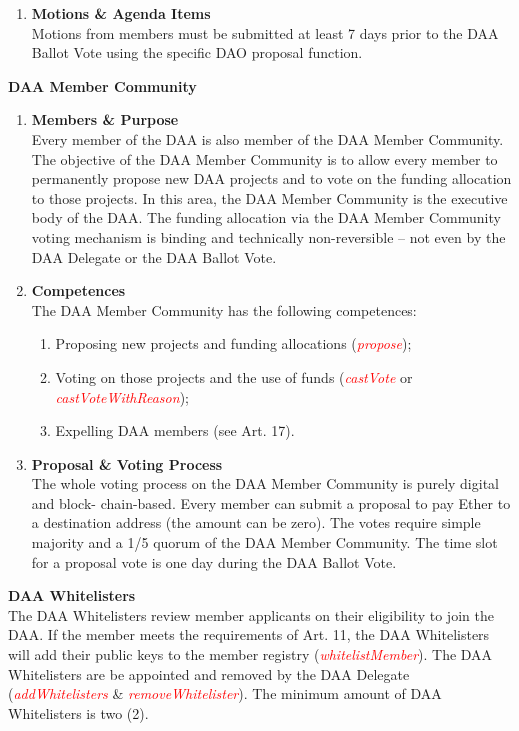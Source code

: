 \begin{enumerate}[label=\textbf{\arabic*.}]
    \item \textbf{Motions \& Agenda Items} \\
    Motions from members must be submitted at least 7 days prior to the DAA Ballot Vote using the specific DAO proposal function.
\end{enumerate}


\item \textbf{DAA Member Community} \\
\begin{enumerate}[label=\textbf{\arabic*.}]
    \item \textbf{Members \& Purpose} \\
    Every member of the DAA is also member of the DAA Member Community.
    The objective of the DAA Member Community is to allow every member to permanently propose new DAA projects and to vote on the funding allocation to those projects. %
    In this area, the DAA Member Community is the executive body of the DAA.
    The funding allocation via the DAA Member Community voting mechanism is binding and technically non-reversible – not even by the DAA Delegate or the DAA Ballot Vote.

    \item \textbf{Competences} \\
    The DAA Member Community has the following competences:
    \begin{enumerate}
        [label=(\alph*)]
        \item Proposing new projects and funding allocations (\textcolor{red}{\emph{propose}});
        \item Voting on those projects and the use of funds (\textcolor{red}{\emph{castVote}} or \textcolor{red}{\emph{castVoteWithReason}});
        \item Expelling DAA members (see Art. 17).
    \end{enumerate}

    \item \textbf{Proposal \& Voting Process} \\
    The whole voting process on the DAA Member Community is purely digital and block- chain-based.
    Every member can submit a proposal to pay Ether to a destination address (the amount can be zero).
    The votes require simple majority and a 1/5 quorum of the DAA Member Community.
    The time slot for a proposal vote is one day during the DAA Ballot Vote.
\end{enumerate}

\item \textbf{DAA Whitelisters} \\
The DAA Whitelisters review member applicants on their eligibility to join the DAA.
If the member meets the requirements of Art. 11, the DAA Whitelisters will add their public keys to the member registry (\textcolor{red}{\emph{whitelistMember}}).
The DAA Whitelisters are be appointed and removed by the DAA Delegate (\textcolor{red}{\emph{addWhitelisters}} \& \textcolor{red}{\emph{removeWhitelister}}).
The minimum amount of DAA Whitelisters is two (2).
